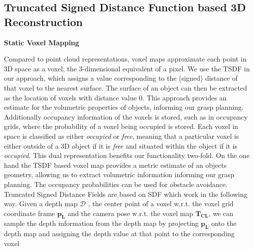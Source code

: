 \subsection{Truncated Signed Distance Function based 3D Reconstruction}
\label{sec:TSDF}

\textbf{Static Voxel Mapping}
\label{sec:static_tsdf}

Compared to point cloud representations, voxel maps approximate each point in 3D space as a voxel, the 3-dimensional equivalent of a pixel. We use the \gls{TSDF}   in our approach, which assigns a value corresponding to the (signed) distance of that voxel to the nearest surface. The surface of an object can then be extracted as the location of voxels with distance value 0. This approach provides an estimate for the volumetric properties of objects, informing our grasp planning. 
Additionally occupancy information of the voxels is stored, such as in occupancy grids, where the probability of a voxel being occupied is stored. Each voxel in space is classified as either {\it occupied} or {\it free}, meaning that a particular voxel is either outside of a 3D object if it is {\it free} and situated within the object if it is {\it occupied}.
This dual representation benefits our functionality two-fold. On the one hand the TSDF based voxel map provides a metric estimate of an objects geometry, allowing us to extract volumetric information informing our grasp planning. The occupancy probabilities can be used for obstacle avoidance.    \\
 
Truncated Signed Distance Fields are based on \gls{SDF} which work in the following way. Given a depth map $\mathcal{D}$ , the center point of a voxel w.r.t. the voxel grid coordinate frame $\boldsymbol{p_L}$ and the camera pose w.r.t. the voxel map  $\boldsymbol{T_{CL}}$, we can sample the depth information from the depth map by projecting $\boldsymbol{p_L}$ onto the depth map and assigning the depth value at that point to the corresponding voxel~\cite{Millane2023} 

